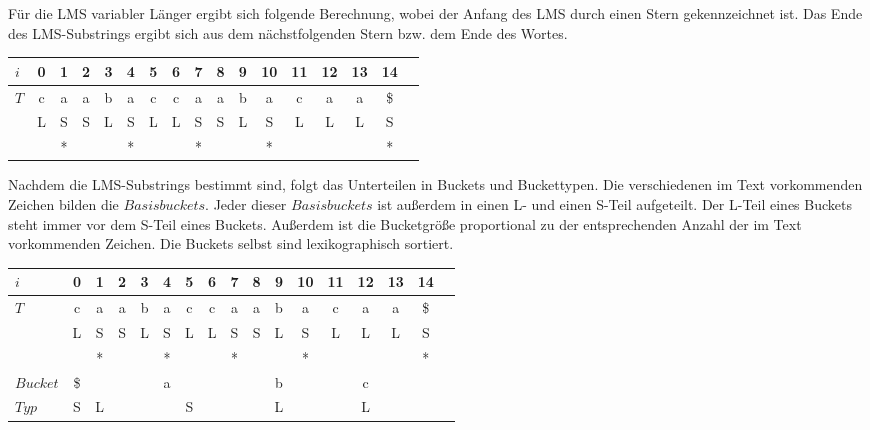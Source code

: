 \noindent Für die LMS variabler Länger ergibt sich folgende Berechnung, wobei der Anfang des LMS durch einen Stern gekennzeichnet ist. Das Ende des LMS-Substrings ergibt sich aus dem nächstfolgenden Stern bzw. dem Ende des Wortes.

\begin{center}
  \begin{tabular}{ | l | c | c | c | c | c | c | c | c | c | c | c | c | c | c | c | c | }
    \hline
        $i$ & 0 & 1 & 2 & 3 & 4 & 5 & 6 & 7 & 8 & 9 & 10 & 11 & 12 & 13 & 14 \\ \hline
        $T$ & c & a & a & b & a & c & c & a & a & b & a & c & a & a & \$ \\ \hline
            & L & S & S & L & S & L & L & S & S & L & S & L & L & L & S \\ \hline
            &   & * &   &   & * &   &   & * &   &   & * &   &   &   & * \\
    \hline
  \end{tabular}
\end{center}
\bigskip
Nachdem die LMS-Substrings bestimmt sind, folgt das Unterteilen in Buckets und Buckettypen. Die verschiedenen im Text vorkommenden Zeichen bilden die  $Basisbuckets$. Jeder dieser $Basisbuckets$ ist außerdem in einen L- und einen S-Teil aufgeteilt. Der L-Teil eines Buckets steht immer vor dem S-Teil eines Buckets. Außerdem ist die Bucketgröße proportional zu der entsprechenden Anzahl der im Text vorkommenden Zeichen. Die Buckets selbst sind lexikographisch sortiert.

\begin{center}
  \begin{tabular}{ | l | c | c | c | c | c | c | c | c | c | c | c | c | c | c | c | c | }
    \hline
        $i$ & 0 & 1 & 2 & 3 & 4 & 5 & 6 & 7 & 8 & 9 & 10 & 11 & 12 & 13 & 14 \\ \hline
        $T$ & c & a & a & b & a & c & c & a & a & b & a & c & a & a & \$ \\ \hline
            & L & S & S & L & S & L & L & S & S & L & S & L & L & L & S \\ \hline
            &   & * &   &   & * &   &   & * &   &   & * &   &   &   & * \\ \hline
   $Bucket$ &\$ & \multicolumn{7}{c}{a} &   & \multicolumn{1}{c}{b} &   & \multicolumn{3}{c}{c} & \\ \hline
      $Typ$ & S & \multicolumn{1}{c}{L} &   & \multicolumn{5}{c}{S} &   & \multicolumn{1}{c}{L} &    & \multicolumn{3}{c}{L} &\\
    \hline
  \end{tabular}
\end{center}
\bigskip

